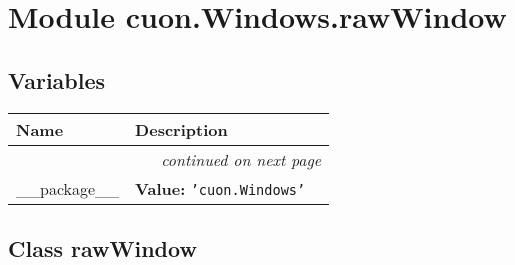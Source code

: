 %
%
%


\section{Module cuon.Windows.rawWindow}

    \label{cuon:Windows:rawWindow}


  \subsection{Variables}

    \vspace{-1cm}
\hspace{\varindent}\begin{longtable}{|p{\varnamewidth}|p{\vardescrwidth}|l}
\cline{1-2}
\cline{1-2} \centering \textbf{Name} & \centering \textbf{Description}& \\
\cline{1-2}
\endhead\cline{1-2}\multicolumn{3}{r}{\small\textit{continued on next page}}\\\endfoot\cline{1-2}
\endlastfoot\raggedright \_\-\_\-p\-a\-c\-k\-a\-g\-e\-\_\-\_\- & \raggedright \textbf{Value:} 
{\tt \texttt{'}\texttt{cuon.Windows}\texttt{'}}&\\
\cline{1-2}
\end{longtable}



\subsection{Class rawWindow}

